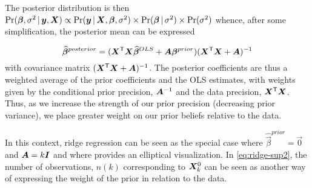 The posterior distribution is then 
$\Pr (\bm{\beta}, \sigma^2 \, | \, \bm{y}, \bm{X}) \propto \Pr (\bm{y} \, | \, \bm{X}, \bm{\beta}, \sigma^2) \times
\Pr (\bm{\beta} \, | \, \sigma^2) \times \Pr (\sigma^2)$
whence, after some simplification,  
the posterior mean can be expressed 

\begin{equation}
\widehat{\bm{\beta}}^{posterior} = 
(\bm{X}^\mathsf{T} \bm{X}\widehat{\bm{\beta}}^{OLS} + \bm{A} \bm{\beta}^{prior})
(\bm{X}^\mathsf{T} \bm{X}+\bm{A})^{-1} 
\end{equation}
with covariance matrix $(\bm{X}^\mathsf{T} \bm{X}+\bm{A})^{-1}$. The posterior coefficients are thus a weighted average of 
the prior coefficients and the OLS estimates, with weights given by the conditional prior precision, $\bm{A}^{-1}$
and the data precision, $\bm{X}^\mathsf{T}\bm{X}$.  Thus, as we increase the strength of our prior precision (decreasing
prior variance), we place greater weight on our prior beliefs relative to the data.

In this context, ridge regression can be seen as the special case where $\widehat{\vec{\beta}}^{prior} = \vec{0}$ and $\bm{A} = k \bm{I}$
and where  provides an elliptical visualization. In \eqref{eq:ridge-sup2}, the number of observations,
$n(k)$ corresponding to $\bm{X}_k^0$ can be seen as another way of expressing the weight of the prior in relation to the data.




